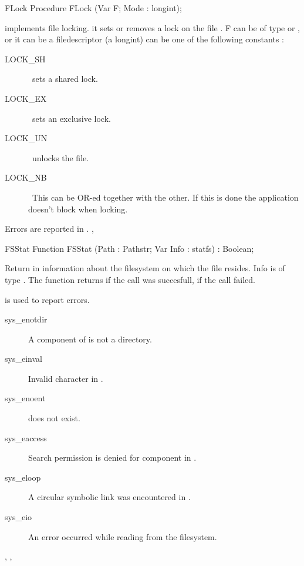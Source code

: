 \latex{}
\html{}
\begin{procedure}{FLock}
\Declaration
Procedure FLock (Var F; Mode : longint);

\Description
{} implements file locking. it sets or removes a lock on the file
. F can be of type  or , or it can be a \linux
filedescriptor (a longint)
 can be one of the following constants :
\begin{description}
\item [LOCK\_SH] \ sets a shared lock.
\item [LOCK\_EX] \ sets an exclusive lock.
\item [LOCK\_UN] \ unlocks the file.
\item [LOCK\_NB] \ This can be OR-ed together with the other. If this is done
the application doesn't block when locking.
\end{description}

\Errors
Errors are reported in .
\SeeAlso
{}, 
\end{procedure}
\begin{function}{FSStat}
\Declaration
Function FSStat (Path : Pathstr; Var Info : statfs) : Boolean;

\Description
 Return in  information about the filesystem on which the file
 resides. Info is of type .
The function returns  if the call was succesfull,  if the call
failed.

\Errors
  is used to report errors.
\begin{description}
\item[sys\_enotdir] A component of  is not a directory.
\item[sys\_einval] Invalid character in .
\item[sys\_enoent]  does not exist.
\item[sys\_eaccess] Search permission is denied for  component in
.
\item[sys\_eloop] A circular symbolic link was encountered in .
\item[sys\_eio] An error occurred while reading from the filesystem.
\end{description}

\SeeAlso
{}, , 
\end{function}
\latex{}
